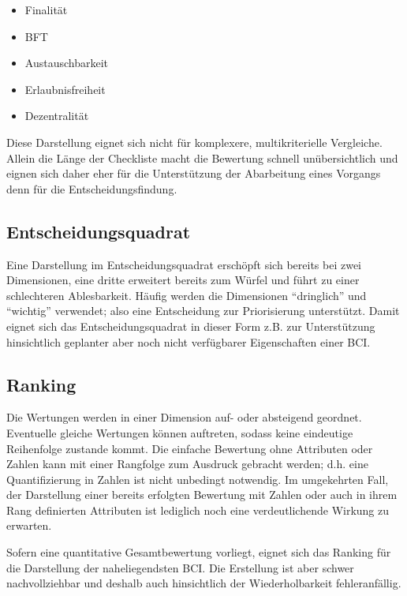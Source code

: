 \begin{itemize}
\item Finalität
\item \gls{BFT}
\item Austauschbarkeit
\item Erlaubnisfreiheit
\item Dezentralität
\end{itemize}

Diese Darstellung eignet sich nicht für komplexere, multikriterielle Vergleiche.
Allein die Länge der Checkliste macht die Bewertung schnell unübersichtlich und eignen sich daher eher für die Unterstützung der Abarbeitung eines Vorgangs denn für die Entscheidungsfindung.

\subsection{Entscheidungsquadrat}

Eine Darstellung im Entscheidungsquadrat erschöpft sich bereits bei zwei Dimensionen, eine dritte erweitert bereits zum Würfel und führt zu einer schlechteren Ablesbarkeit.
Häufig werden die Dimensionen \enquote{dringlich} und \enquote{wichtig} verwendet; also eine Entscheidung zur Priorisierung unterstützt.
Damit eignet sich das Entscheidungsquadrat in dieser Form z.B. zur Unterstützung hinsichtlich geplanter aber noch nicht verfügbarer Eigenschaften einer \gls{BCI}.

\subsection{Ranking}\label{dep:ranking}

Die Wertungen werden in einer Dimension auf- oder absteigend geordnet. Eventuelle gleiche Wertungen können auftreten, sodass keine eindeutige Reihenfolge zustande kommt.
Die einfache Bewertung ohne Attributen oder Zahlen kann mit einer Rangfolge zum Ausdruck gebracht werden; d.h. eine Quantifizierung in Zahlen ist nicht unbedingt notwendig.
Im umgekehrten Fall, der Darstellung einer bereits erfolgten Bewertung mit Zahlen oder auch in ihrem Rang definierten Attributen ist lediglich noch eine verdeutlichende Wirkung zu erwarten.

Sofern eine quantitative Gesamtbewertung vorliegt, eignet sich das Ranking für die Darstellung der naheliegendsten \gls{BCI}.
Die Erstellung ist aber schwer nachvollziehbar und deshalb auch hinsichtlich der Wiederholbarkeit fehleranfällig.

